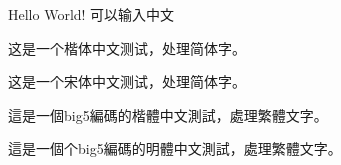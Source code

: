 \documentclass{article}
\begin{document}
\begin{CJK}{UTF8}{gbsn}
  Hello World!
  可以输入中文

\end{CJK}


\begin{CJK}{UTF8}{gkai}  
这是一个楷体中文测试，处理简体字。  
\end{CJK}  
\begin{CJK}{UTF8}{gbsn}  
这是一个宋体中文测试，处理简体字。  
\end{CJK}  
\begin{CJK}{UTF8}{bkai}  
這是一個big5編碼的楷體中文測試，處理繁體文字。  
\end{CJK}  
\begin{CJK}{UTF8}{bsmi}  
這是一個个big5編碼的明體中文測試，處理繁體文字。  
\end{CJK}  
\end{document}
